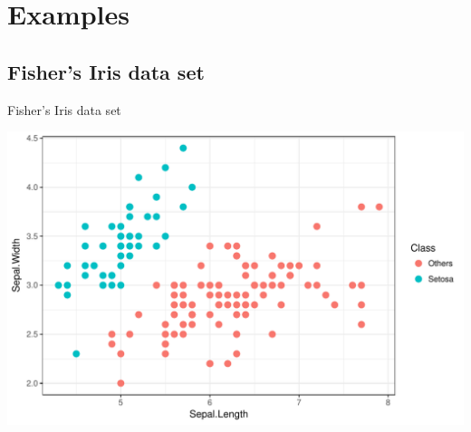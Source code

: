 \documentclass{beamer}\usepackage[]{graphicx}\usepackage[]{color}
\makeatletter
\def\maxwidth{ %
  \ifdim\Gin@nat@width>\linewidth
    \linewidth
  \else
    \Gin@nat@width
  \fi
}
\newenvironment{knitrout}{}{} %
\makeatother
\begin{document}
\ifstandalone
  \section{Examples}
\fi

\subsection{Fisher's Iris data set}

\begin{frame}[fragile]{Fisher's Iris data set}
\begin{knitrout}\small
{}\color{fgcolor}

{\centering \includegraphics[width=\maxwidth]{figure/data_iris-1} 

}



\end{knitrout}
\end{frame}
\end{document}
